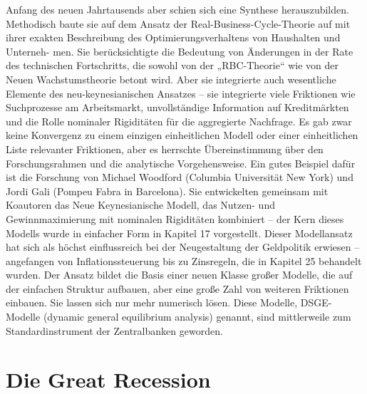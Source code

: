 Anfang des neuen Jahrtausends aber schien sich eine Synthese herauszubilden.
Methodisch baute sie auf dem Ansatz der Real-Business-Cycle-Theorie auf mit ihrer
exakten Beschreibung des Optimierungsverhaltens von Haushalten und Unterneh-
men. Sie berücksichtigte die Bedeutung von Änderungen in der Rate des technischen
Fortschritts, die sowohl von der „RBC-Theorie“ wie von der Neuen Wachstumstheorie
betont wird. Aber sie integrierte auch wesentliche Elemente des neu-keynesianischen
Ansatzes – sie integrierte viele Friktionen wie Suchprozesse am Arbeitsmarkt, unvollständige
Information auf Kreditmärkten und die Rolle nominaler Rigiditäten für die
aggregierte Nachfrage. Es gab zwar keine Konvergenz zu einem einzigen einheitlichen
Modell oder einer einheitlichen Liste relevanter Friktionen, aber es herrschte Übereinstimmung
über den Forschungsrahmen und die analytische Vorgehensweise.
Ein gutes Beispiel dafür ist die Forschung von Michael Woodford (Columbia Universität
New York) und Jordi Gali (Pompeu Fabra in Barcelona). Sie entwickelten gemeinsam
mit Koautoren das Neue Keynesianische Modell, das Nutzen- und Gewinnmaximierung
mit nominalen Rigiditäten kombiniert – der Kern dieses Modells wurde in
einfacher Form in Kapitel 17 vorgestellt. Dieser Modellansatz hat sich als höchst einflussreich
bei der Neugestaltung der Geldpolitik erwiesen – angefangen von Inflationssteuerung
bis zu Zinsregeln, die in Kapitel 25 behandelt wurden. Der Ansatz bildet die
Basis einer neuen Klasse großer Modelle, die auf der einfachen Struktur aufbauen, aber
eine große Zahl von weiteren Friktionen einbauen. Sie lassen sich nur mehr numerisch
lösen. Diese Modelle, DSGE-Modelle (dynamic general equilibrium analysis) genannt,
sind mittlerweile zum Standardinstrument der Zentralbanken geworden.


\section{Die Great Recession}


